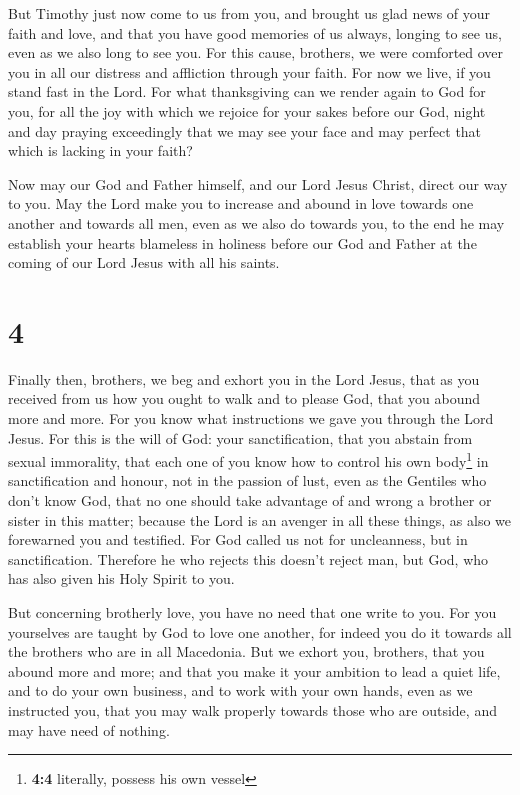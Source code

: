  But Timothy just now come to us from you, and brought us
glad news of your faith and love, and that you have good memories of us
always, longing to see us, even as we also long to see you.
 For this cause, brothers, we were comforted over you in
all our distress and affliction through your faith.  For
now we live, if you stand fast in the Lord.  For what
thanksgiving can we render again to God for you, for all the joy with
which we rejoice for your sakes before our God,  night
and day praying exceedingly that we may see your face and may perfect
that which is lacking in your faith?

 Now may our God and Father himself, and our Lord Jesus
Christ, direct our way to you.  May the Lord make you to
increase and abound in love towards one another and towards all men,
even as we also do towards you,  to the end he may
establish your hearts blameless in holiness before our God and Father at
the coming of our Lord Jesus with all his saints.

\hypertarget{section-3}{%
\section{4}\label{section-3}}

 Finally then, brothers, we beg and exhort you in the Lord
Jesus, that as you received from us how you ought to walk and to please
God, that you abound more and more.  For you know what
instructions we gave you through the Lord Jesus.  For this
is the will of God: your sanctification, that you abstain from sexual
immorality,  that each one of you know how to control his
own body\footnote{\textbf{4:4} literally, possess his own vessel} in
sanctification and honour,  not in the passion of lust,
even as the Gentiles who don't know God,  that no one
should take advantage of and wrong a brother or sister in this matter;
because the Lord is an avenger in all these things, as also we
forewarned you and testified.  For God called us not for
uncleanness, but in sanctification.  Therefore he who
rejects this doesn't reject man, but God, who has also given his Holy
Spirit to you.

 But concerning brotherly love, you have no need that one
write to you. For you yourselves are taught by God to love one another,
 for indeed you do it towards all the brothers who are in
all Macedonia. But we exhort you, brothers, that you abound more and
more;  and that you make it your ambition to lead a quiet
life, and to do your own business, and to work with your own hands, even
as we instructed you,  that you may walk properly towards
those who are outside, and may have need of nothing.

